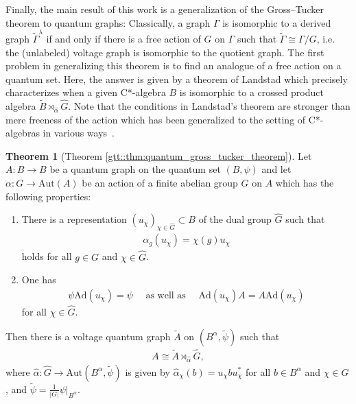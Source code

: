 \documentclass{amsart}
\theoremstyle{definition}
\newtheorem{introthm}{Theorem}
\theoremstyle{definition}
\begin{document}
Finally, the main result of this work is a generalization of the Gross--Tucker theorem to quantum graphs: Classically, a graph $\Gamma$ is isomorphic to a derived graph $\tilde{\Gamma}^\lambda$ if and only if there is a free action of $G$ on $\Gamma$ such that $\tilde{\Gamma} \cong \Gamma / G$, i.e. the (unlabeled) voltage graph is isomorphic to the quotient graph. The first problem in generalizing this theorem is to find an analogue of a free action on a quantum set. Here, the answer is given by a theorem of Landstad \cite{landstad_duality_1979} which precisely characterizes when a given C*-algebra $B$ is isomorphic to a crossed product algebra $\tilde{B} \rtimes_{\hat{\alpha}} \hat{G}$. Note that the conditions in Landstad's theorem are stronger than mere freeness of the action which has been generalized to the setting of C*-algebras in various ways~\cite{phillips_freeness_1987, rieffel_proper_1990, baum_decommer_hajac_free_2017}.

\begin{introthm}[Theorem \ref{gtt::thm:quantum_gross_tucker_theorem}]
    Let $A: B \to B$ be a quantum graph on the quantum set $(B, \psi)$ and let $\alpha: G \to \mathrm{Aut}(A)$ be an action of a finite abelian group $G$ on $A$ which has the following properties:
    \begin{enumerate}
        \item There is a representation $(u_\chi)_{\chi \in \hat{G}} \subset B$ of the dual group $\hat{G}$ such that
        \begin{align*}
            \alpha_g(u_\chi) = \chi(g) u_\chi
        \end{align*}
        holds for all $g \in G$ and $\chi \in \hat{G}$.
        \item One has 
        \begin{align*}
            \psi \mathrm{Ad}(u_\chi) = \psi 
            \quad \text{ as well as } \quad
            \mathrm{Ad}(u_\chi) A = A \mathrm{Ad}(u_\chi)
        \end{align*}
        for all $\chi \in \hat{G}$.
    \end{enumerate}
    Then there is a voltage quantum graph $\tilde{A}$ on $(B^\alpha, \tilde{\psi})$ such that
    \begin{align*}
        A \cong \tilde{A} \rtimes_{\hat{\alpha}} \hat{G},
    \end{align*}
    where $\hat{\alpha}: \hat{G} \to \mathrm{Aut}(B^\alpha, \tilde{\psi})$ is given by $\hat{\alpha}_\chi(b) = u_\chi b u_\chi^*$ for all $b \in B^\alpha$ and $\chi \in \hat{G}$, and $\tilde{\psi} = \frac{1}{|G|} \psi|_{B^\alpha}$.
\end{introthm}
\end{document}
